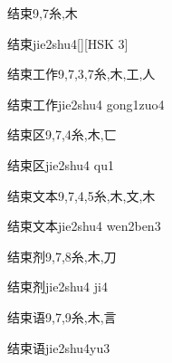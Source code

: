 \begin{Entry}{结束}{9,7}{⽷,⽊}
  \begin{Phonetics}{结束}{jie2shu4}[][HSK 3]
  \end{Phonetics}
\end{Entry}

\begin{Entry}{结束工作}{9,7,3,7}{⽷,⽊,⼯,⼈}
  \begin{Phonetics}{结束工作}{jie2shu4 gong1zuo4}
  \end{Phonetics}
\end{Entry}

\begin{Entry}{结束区}{9,7,4}{⽷,⽊,⼖}
  \begin{Phonetics}{结束区}{jie2shu4 qu1}
  \end{Phonetics}
\end{Entry}

\begin{Entry}{结束文本}{9,7,4,5}{⽷,⽊,⽂,⽊}
  \begin{Phonetics}{结束文本}{jie2shu4 wen2ben3}
  \end{Phonetics}
\end{Entry}

\begin{Entry}{结束剂}{9,7,8}{⽷,⽊,⼑}
  \begin{Phonetics}{结束剂}{jie2shu4 ji4}
  \end{Phonetics}
\end{Entry}

\begin{Entry}{结束语}{9,7,9}{⽷,⽊,⾔}
  \begin{Phonetics}{结束语}{jie2shu4yu3}
  \end{Phonetics}
\end{Entry}

